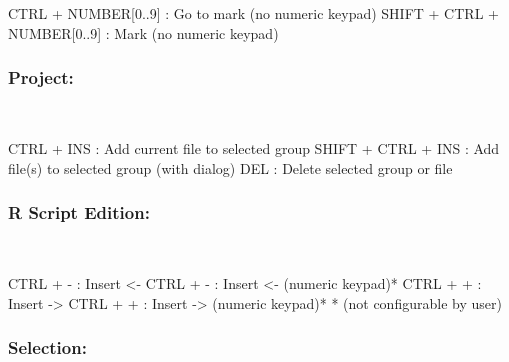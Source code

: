 \vspace{-0.5cm}
\begin{Rtables}[caption={[Marks and go to marks keyboard shortcuts]
    Marks and go to marks keyboard shortcuts},
  label=hotkey:marks]
  CTRL  + NUMBER[0..9]        : Go to mark (no numeric keypad)
  SHIFT + CTRL + NUMBER[0..9] : Mark (no numeric keypad)
\end{Rtables}


\newpage
\subsubsection{Project:}\\

\vspace{-0.5cm}
\begin{Rtables}[caption={[Project keyboard shortcuts]
    Project keyboard shortcuts},
  label=hotkey:project]
  CTRL  + INS        : Add current file to selected group
  SHIFT + CTRL + INS : Add file(s) to selected group (with dialog)
  DEL                : Delete selected group or file
\end{Rtables}


\subsubsection{R Script Edition:}\\

\vspace{-0.5cm}
\begin{Rtables}[caption={[R script edition keyboard shortcuts]
    R script edition keyboard shortcuts},
  label=hotkey:rscript]
  CTRL + - : Insert <-
  CTRL + - : Insert <-  (numeric keypad)*
  CTRL + + : Insert ->
  CTRL + + : Insert ->  (numeric keypad)*
  * (not configurable by user)
\end{Rtables}


\subsubsection{Selection:}\\

